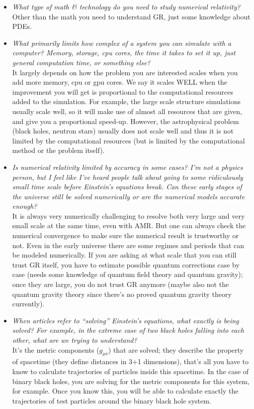 \documentclass[11pt]{homework}
\begin{document}
\begin{itemize}
\item {\em  What type of math \& technology do you need to study numerical relativity?} \\
Other than the math you need to understand GR, just some knowledge about PDEs.

\item {\em What primarily limits how complex of a system you can simulate with a computer? Memory, storage, cpu cores, the time it takes to set it up, just general computation time, or something else?} \\
It largely depends on how the problem you are interested scales when you add more memory, cpu or gpu cores. We say it scales WELL when the improvement you will get is proportional to the computational resources added to the simulation. For example, the large scale structure simulations usually scale well, so it will make use of almost all resources that are given, and give you a proportional speed-up. However, the astrophysical problem (black holes, neutron stars) usually does not scale well and thus it is not limited by the computational resources (but is limited by the computational method or the problem itself).

\item {\em Is numerical relativity limited by accuracy in some cases? I'm not a physics person, but I feel like I've heard people talk about going to some ridiculously small time scale before Einstein's equations break. Can these early stages of the universe still be solved numerically or are the numerical models accurate enough?} \\
It is always very numerically challenging to resolve both very large and very small scale at the same time, even with AMR. But one can always check the numerical convergence to make sure the numerical result is trustworthy or not. Even in the early universe there are some regimes and periods that can be modeled numerically. If you are asking at what scale that you can still trust GR itself, you have to estimate possible quantum corrections case by case (needs some knowledge of quantum field theory and quantum gravity); once they are large, you do not trust GR anymore (maybe also not the quantum gravity theory since there's no proved quantum gravity theory currently).

\item {\em When articles refer to ``solving'' Einstein's equations, what exactly is being solved? For example, in the extreme case of two black holes falling into each other, what are we trying to understand?} \\
It's the metric components ($g_{\mu\nu}$) that are solved; they describe the property of spacetime (they define distances in 3+1 dimensions), that's all you have to know to calculate trajectories of particles inside this spacetime. In the case of binary black holes, you are solving for the metric components for this system, for example. Once you know this, you will be able to calculate exactly the trajectories of test particles around the binary black hole system.

\end{itemize}
\end{document}
